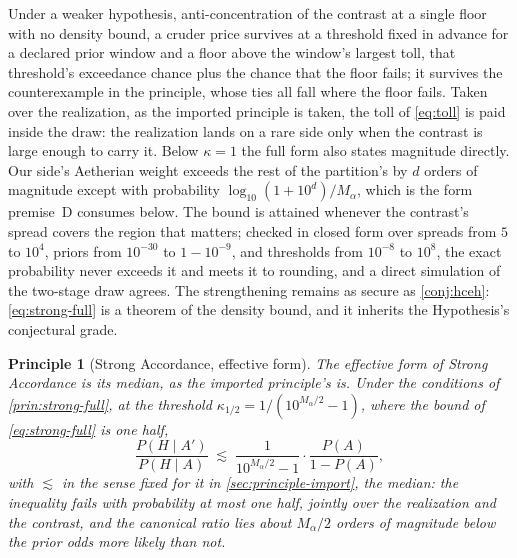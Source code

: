 \documentclass[11pt]{article}
\newtheorem{principle}{Principle}
\theoremstyle{definition}
\begin{document}
\noindent Under a weaker hypothesis, anti-concentration of the contrast at a single floor with no density bound, a cruder price survives at a threshold fixed in advance for a declared prior window and a floor above the window's largest toll, that threshold's exceedance chance plus the chance that the floor fails; it survives the counterexample in the principle, whose ties all fall where the floor fails. Taken over the realization, as the imported principle is taken, the toll of \eqref{eq:toll} is paid inside the draw: the realization lands on a rare side only when the contrast is large enough to carry it. Below $\kappa = 1$ the full form also states magnitude directly. Our side's Aetherian weight exceeds the rest of the partition's by $d$ orders of magnitude except with probability $\log_{10}(1 + 10^{d})/M_\alpha$, which is the form premise~D consumes below. The bound is attained whenever the contrast's spread covers the region that matters; checked in closed form over spreads from $5$ to $10^{4}$, priors from $10^{-30}$ to $1 - 10^{-9}$, and thresholds from $10^{-8}$ to $10^{8}$, the exact probability never exceeds it and meets it to rounding, and a direct simulation of the two-stage draw agrees. The strengthening remains as secure as \autoref{conj:hceh}: \eqref{eq:strong-full} is a theorem of the density bound, and it inherits the Hypothesis's conjectural grade.

\begin{principle}[Strong Accordance, effective form]
\label{prin:strong}
The effective form of Strong Accordance is its median, as the imported principle's is. Under the conditions of \autoref{prin:strong-full}, at the threshold $\kappa_{1/2} = 1/(10^{M_\alpha/2} - 1)$, where the bound of \eqref{eq:strong-full} is one half,
\begin{equation}
\label{eq:strong-median}
\frac{P(H \mid A')}{P(H \mid A)} \;\lesssim\; \frac{1}{10^{M_\alpha/2} - 1} \cdot \frac{P(A)}{1 - P(A)},
\end{equation}
with $\lesssim$ in the sense fixed for it in \autoref{sec:principle-import}, the median: the inequality fails with probability at most one half, jointly over the realization and the contrast, and the canonical ratio lies about $M_\alpha/2$ orders of magnitude below the prior odds more likely than not.
\end{principle}
\end{document}
